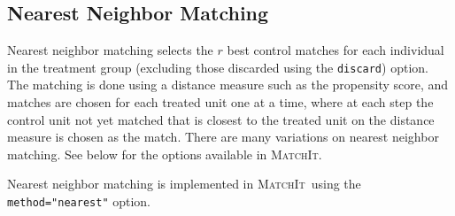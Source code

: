 \documentclass[oneside,letterpaper,titlepage]{article}
\newcommand{\MatchIt}{\textsc{MatchIt}}
\begin{document}
\subsection{Nearest Neighbor Matching}
\label{nearest}

Nearest neighbor matching selects the $r$ best control matches for
each individual in the treatment group (excluding those discarded
using the \texttt{discard}) option.  The matching is done using a
distance measure such as the propensity score, and matches are chosen
for each treated unit one at a time, where at each step the control
unit not yet matched that is closest to the treated unit on the
distance measure is chosen as the match.  There are many variations on
nearest neighbor matching.  See below for the options available in
\MatchIt.

Nearest neighbor matching is implemented in \MatchIt\ using the
\texttt{method="nearest"} option.
\end{document}
